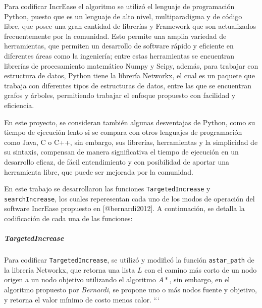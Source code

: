 \documentclass[]{article}
\let\oldsubparagraph\subparagraph
\renewcommand{\subparagraph}[1]{\oldsubparagraph{#1}\mbox{}}
\begin{document}
Para codificar IncrEase el algoritmo se utilizó el lenguaje de
programación Python, puesto que es un lenguaje de alto nivel,
multiparadigma y de código libre, que posee una gran cantidad de
librerías y Framework que son actualizados frecuentemente por la
comunidad. Esto permite una amplia variedad de herramientas, que
permiten un desarrollo de software rápido y eficiente en diferentes
áreas como la ingeniería; entre estas herramientas se encuentran
librerías de procesamiento matemático Numpy y Scipy, además, para
trabajar con estructura de datos, Python tiene la librería Networkx, el
cual es un paquete que trabaja con diferentes tipos de estructuras de
datos, entre las que se encuentran grafos y árboles, permitiendo
trabajar el enfoque propuesto con facilidad y eficiencia.

En este proyecto, se consideran también algunas desventajas de Python,
como su tiempo de ejecución lento si se compara con otros lenguajes de
programación como Java, C o C++, sin embargo, sus librerías,
herramientas y la simplicidad de su sintaxis, compensan de manera
significativa el tiempo de ejecución en un desarrollo eficaz, de fácil
entendimiento y con posibilidad de aportar una herramienta libre, que
puede ser mejorada por la comunidad.

En este trabajo se desarrollaron las funciones \texttt{TargetedIncrease}
y \texttt{searchIncrease}, los cuales reperesentan cada uno de los modos
de operación del software IncrEase propuesto en {[}@bernardi2012{]}. A
continuación, se detalla la codificación de cada una de las funciones:

\subparagraph{TargetedIncrease}\label{targetedincrease}

Para codificar \texttt{TargetedIncrease}, se utilizó y modificó la
función \texttt{astar\_path} de la librería Networkx, que retorna una
lista \(L\) con el camino más corto de un nodo origen a un nodo objetivo
utilizando el algoritmo \(A*\), sin embargo, en el algoritmo propuesto
por \emph{Bernardi}, se propone uno o más nodos fuente y objetivo, y
retorna el valor mínimo de costo menos calor. ```
\end{document}
